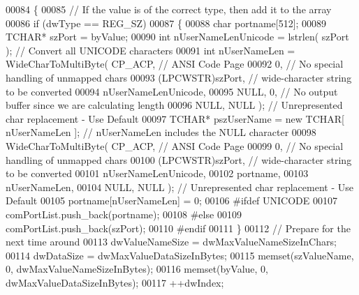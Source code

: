 \begin{DoxyCode}
00084                 \{
00085                     \textcolor{comment}{// If the value is of the correct type, then add it to the array}
00086                     \textcolor{keywordflow}{if} (dwType == REG\_SZ)
00087                     \{
00088                         \textcolor{keywordtype}{char} portname[512];
00089                         TCHAR* szPort = byValue;
00090                         \textcolor{keywordtype}{int} nUserNameLenUnicode = lstrlen( szPort ); \textcolor{comment}{// Convert all UNICODE characters}
00091                         \textcolor{keywordtype}{int} nUserNameLen = WideCharToMultiByte( CP\_ACP, \textcolor{comment}{// ANSI Code Page}
00092                         0, \textcolor{comment}{// No special handling of unmapped chars}
00093                         (LPCWSTR)szPort, \textcolor{comment}{// wide-character string to be converted}
00094                         nUserNameLenUnicode,
00095                         NULL, 0, \textcolor{comment}{// No output buffer since we are calculating length}
00096                         NULL, NULL ); \textcolor{comment}{// Unrepresented char replacement - Use Default}
00097                         TCHAR* pszUserName = \textcolor{keyword}{new} TCHAR[ nUserNameLen ]; \textcolor{comment}{// nUserNameLen includes the NULL
       character}
00098                         WideCharToMultiByte( CP\_ACP, \textcolor{comment}{// ANSI Code Page}
00099                         0, \textcolor{comment}{// No special handling of unmapped chars}
00100                         (LPCWSTR)szPort, \textcolor{comment}{// wide-character string to be converted}
00101                         nUserNameLenUnicode,
00102                         portname,
00103                         nUserNameLen,
00104                         NULL, NULL ); \textcolor{comment}{// Unrepresented char replacement - Use Default}
00105                         portname[nUserNameLen] = 0;
00106 \textcolor{preprocessor}{#ifdef UNICODE}
00107                         comPortList.push\_back(portname);
00108 \textcolor{preprocessor}{#else}
00109                         comPortList.push\_back(szPort);
00110 \textcolor{preprocessor}{#endif}
00111                     \}
00112                     \textcolor{comment}{// Prepare for the next time around}
00113                     dwValueNameSize = dwMaxValueNameSizeInChars;
00114                     dwDataSize = dwMaxValueDataSizeInBytes;
00115                     memset(szValueName, 0, dwMaxValueNameSizeInBytes);
00116                     memset(byValue, 0, dwMaxValueDataSizeInBytes);
00117                     ++dwIndex;

\end{DoxyCode}
